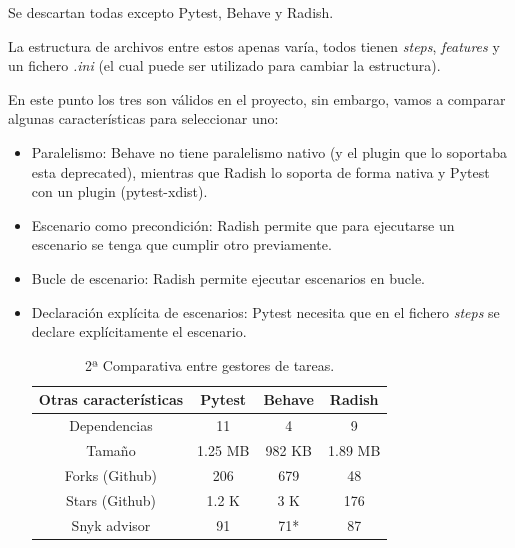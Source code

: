 Se descartan todas excepto Pytest, Behave y Radish.

La estructura de archivos entre estos apenas varía, todos tienen \textit{steps}, \textit{features} y un fichero \textit{.ini} (el cual puede ser utilizado para cambiar la estructura).

En este punto los tres son válidos en el proyecto, sin embargo, vamos a comparar algunas características para seleccionar uno:

\begin{itemize}
    \item Paralelismo: Behave no tiene paralelismo nativo (y el plugin que lo soportaba esta deprecated), mientras que Radish lo soporta de forma nativa y Pytest con un plugin (pytest-xdist).
    \item Escenario como precondición: Radish permite que para ejecutarse un escenario se tenga que cumplir otro previamente.
    \item Bucle de escenario: Radish permite ejecutar escenarios en bucle.
    \item Declaración explícita de escenarios: Pytest necesita que en el fichero \textit{steps} se declare explícitamente el escenario.
    \begin{table}[H]
        \centering
        \begin{adjustbox}{width=\textwidth, totalheight=\textheight, keepaspectratio}
            \begin{tabular}{|c|c|c|c|}
            \hline
            Otras características & Pytest & Behave & Radish \\
            \hline
            Dependencias & 11 & 4 & 9 \\
            \hline
            Tamaño & 1.25 MB & 982 KB & 1.89 MB \\
            \hline
            Forks (Github) & 206 & 679 & 48 \\
            \hline
            Stars (Github) & 1.2 K & 3 K & 176 \\
            \hline
            Snyk advisor  & 91 & 71* & 87 \\
            \hline
            \end{tabular}
        \end{adjustbox}
            \caption{2ª Comparativa entre gestores de tareas.}
    \end{table}
\end{itemize}


